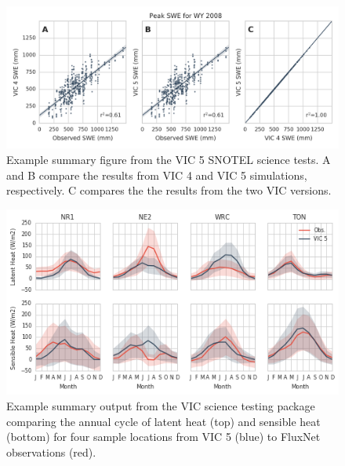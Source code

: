 \documentclass[gmd, manuscript]{copernicus}
\begin{document}
\clearpage
\begin{figure}[t]
\includegraphics[width=6in]{VIC_science_tests_SWE.png}
\caption{Example summary figure from the VIC 5 SNOTEL science tests. A and B compare the results from VIC 4 and VIC 5 simulations, respectively. C compares the the results from the two VIC versions.}
\label{fig:vic_4v5}
\end{figure}

\clearpage
\begin{figure}[t]
\includegraphics[width=12cm]{VIC_science_tests_fluxes.png}
\caption{Example summary output from the VIC science testing package comparing the annual cycle of latent heat (top) and sensible heat (bottom) for four sample locations from VIC 5 (blue) to FluxNet observations (red).}
\label{fig:vic_fluxes}
\end{figure}
\end{document}
